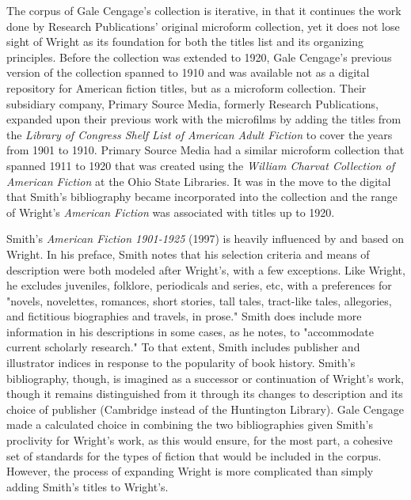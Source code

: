 The corpus of Gale Cengage's collection is iterative, in that it continues the work done by Research Publications' original microform collection, yet it does not lose sight of Wright as its foundation for both the titles list and its organizing principles. Before the collection was extended to 1920, Gale Cengage's previous version of the collection spanned to 1910 and was available not as a digital repository for American fiction titles, but as a microform collection. Their subsidiary company, Primary Source Media, formerly Research Publications, expanded upon their previous work with the microfilms by adding the titles from the \textit{Library of Congress Shelf List of American Adult Fiction} to cover the years from 1901 to 1910. Primary Source Media had a similar microform collection that spanned 1911 to 1920 that was created using the \textit{William Charvat Collection of American Fiction} at the Ohio State Libraries. It was in the move to the digital that Smith's bibliography became incorporated into the collection and the range of Wright's \textit{American Fiction} was associated with titles up to 1920.\autocite{noauthor_american_nodate}

Smith's \textit{American Fiction 1901-1925} (1997) is heavily influenced by and based on Wright. In his preface, Smith notes that his selection criteria and means of description were both modeled after Wright's, with a few exceptions. Like Wright, he excludes juveniles, folklore, periodicals and series, etc, with a preferences for "novels, novelettes, romances, short stories, tall tales, tract-like tales, allegories, and fictitious biographies and travels, in prose."\autocite[ix]{smith_american_1997} Smith does include more information in his descriptions in some cases, as he notes, to "accommodate current scholarly research." To that extent, Smith includes publisher and illustrator indices in response to the popularity of book history. Smith's bibliography, though, is imagined as a successor or continuation of Wright's work, though it remains distinguished from it through its changes to description and its choice of publisher (Cambridge instead of the Huntington Library). Gale Cengage made a calculated choice in combining the two bibliographies given Smith's proclivity for Wright's work, as this would ensure, for the most part, a cohesive set of standards for the types of fiction that would be included in the corpus. However, the process of expanding Wright is more complicated than simply adding Smith's titles to Wright's.   

